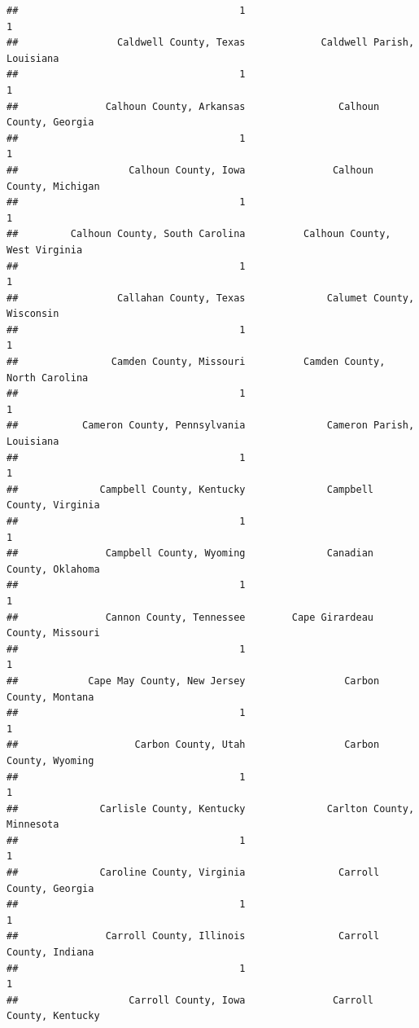 \documentclass[
]{article}
\begin{document}
\begin{verbatim}
##                                      1                                      1 
##                 Caldwell County, Texas             Caldwell Parish, Louisiana 
##                                      1                                      1 
##               Calhoun County, Arkansas                Calhoun County, Georgia 
##                                      1                                      1 
##                   Calhoun County, Iowa               Calhoun County, Michigan 
##                                      1                                      1 
##         Calhoun County, South Carolina          Calhoun County, West Virginia 
##                                      1                                      1 
##                 Callahan County, Texas              Calumet County, Wisconsin 
##                                      1                                      1 
##                Camden County, Missouri          Camden County, North Carolina 
##                                      1                                      1 
##           Cameron County, Pennsylvania              Cameron Parish, Louisiana 
##                                      1                                      1 
##              Campbell County, Kentucky              Campbell County, Virginia 
##                                      1                                      1 
##               Campbell County, Wyoming              Canadian County, Oklahoma 
##                                      1                                      1 
##               Cannon County, Tennessee        Cape Girardeau County, Missouri 
##                                      1                                      1 
##            Cape May County, New Jersey                 Carbon County, Montana 
##                                      1                                      1 
##                    Carbon County, Utah                 Carbon County, Wyoming 
##                                      1                                      1 
##              Carlisle County, Kentucky              Carlton County, Minnesota 
##                                      1                                      1 
##              Caroline County, Virginia                Carroll County, Georgia 
##                                      1                                      1 
##               Carroll County, Illinois                Carroll County, Indiana 
##                                      1                                      1 
##                   Carroll County, Iowa               Carroll County, Kentucky 

\end{verbatim}
\end{document}
